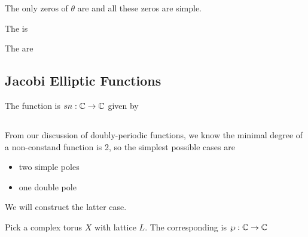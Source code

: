 \documentclass{article}
\begin{document}
\begin{prop}
	The only zeros of $\theta$ are 
	and all these zeros are simple. 
\end{prop}

\begin{definition}
	The  is 
\end{definition}

\begin{definition}
	The  are 
\end{definition}
\subsection{Jacobi Elliptic Functions}

\begin{definition}
	The  function is $sn:\mathbb{C} \to \mathbb{C}$ given by 
\end{definition}

\subsection{}

From our discussion of doubly-periodic functions, we know the minimal degree of a non-constand function is 2, so the simplest possible cases are 
\begin{itemize}
	\item two simple poles
	\item one double pole
\end{itemize}
We will construct the latter case.

\begin{definition}
	Pick a complex torus $X$ with lattice $L$. The corresponding  is $\wp:\mathbb{C} \to \mathbb{C}$ 
\end{definition}
\end{document}
